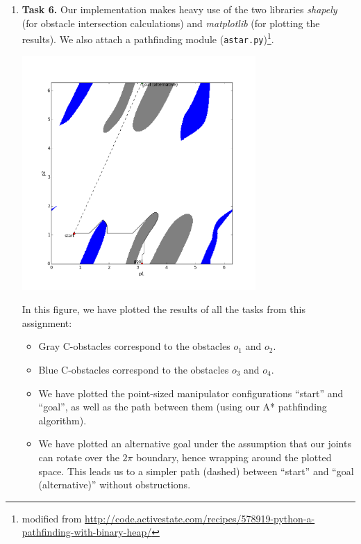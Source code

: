 \documentclass[a4paper,11pt]{article}
\author{\authorinfo}
\title{\titleinfo}
\date{\today}
\begin{document}
\maketitle
\begin {enumerate}

\item[\textbf{Task 6.}]
    Our implementation makes heavy use of the two libraries \emph{shapely} (for obstacle
    intersection calculations) and \emph{matplotlib} (for plotting the results). We also attach a
    pathfinding module (\texttt{astar.py})\footnote{modified from \url{http://code.activestate.com/recipes/578919-python-a-pathfinding-with-binary-heap/}}.

    \centering
    \includegraphics[width=0.7\textwidth]{figure_1.png}
    \flushleft

    In this figure, we have plotted the results of all the tasks from this assignment:

    \begin{itemize}
        \item Gray C-obstacles correspond to the obstacles $o_1$ and $o_2$.
        \item Blue C-obstacles correspond to the obstacles $o_3$ and $o_4$.
        \item We have plotted the point-sized manipulator configurations ``start'' and ``goal'', as
            well as the path between them (using our A* pathfinding algorithm).
        \item We have plotted an alternative goal under the assumption that our joints can rotate
            over the $2\pi$ boundary, hence wrapping around the plotted space. This leads us to
            a simpler path (dashed) between ``start'' and ``goal (alternative)'' without obstructions.
    \end{itemize}

    
	    	
\end {enumerate}
\end{document}
